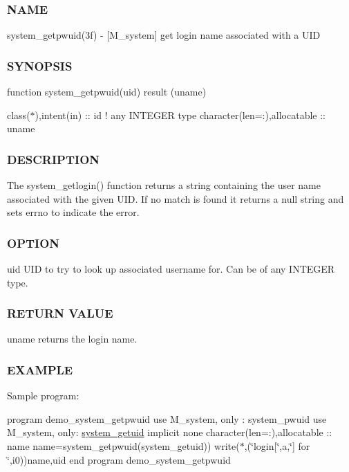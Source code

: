 \subsubsection*{N\+A\+ME}

system\+\_\+getpwuid(3f) -\/ \mbox{[}M\+\_\+system\mbox{]} get login name associated with a U\+ID \subsubsection*{S\+Y\+N\+O\+P\+S\+IS}

function system\+\_\+getpwuid(uid) result (uname)

class($\ast$),intent(in) \+:\+: id ! any I\+N\+T\+E\+G\+ER type character(len=\+:),allocatable \+:\+: uname

\subsubsection*{D\+E\+S\+C\+R\+I\+P\+T\+I\+ON}

\begin{DoxyVerb}The system_getlogin() function returns a string containing the user
name associated with the given UID. If no match is found
it returns a null string and sets errno to indicate the error.
\end{DoxyVerb}


\subsubsection*{O\+P\+T\+I\+ON}

uid U\+ID to try to look up associated username for. Can be of any I\+N\+T\+E\+G\+ER type.

\subsubsection*{R\+E\+T\+U\+RN V\+A\+L\+UE}

uname returns the login name.

\subsubsection*{E\+X\+A\+M\+P\+LE}

Sample program\+:

program demo\+\_\+system\+\_\+getpwuid use M\+\_\+system, only \+: system\+\_\+pwuid use M\+\_\+system, only\+: \hyperlink{interfacem__system_1_1system__getuid}{system\+\_\+getuid} implicit none character(len=\+:),allocatable \+:\+: name name=system\+\_\+getpwuid(system\+\_\+getuid)) write($\ast$,\textquotesingle{}(\char`\"{}login\mbox{[}\char`\"{},a,\char`\"{}\mbox{]} for \char`\"{},i0)\textquotesingle{})name,uid end program demo\+\_\+system\+\_\+getpwuid 

